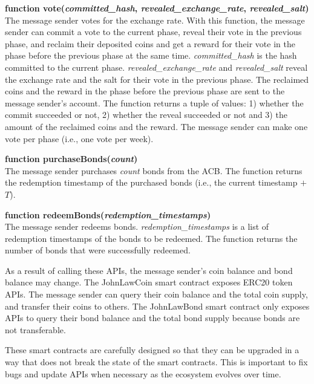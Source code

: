 \documentclass[dvipdfmx,a4paper]{article}
\begin{document}
\begin{description}
\item{\textbf{function vote(\textit{committed\_hash}, \textit{revealed\_exchange\_rate}, \textit{revealed\_salt})}}\\
The message sender votes for the exchange rate. With this function, the message sender can commit a vote to the current phase, reveal their vote in the previous phase, and reclaim their deposited coins and get a reward for their vote in the phase before the previous phase at the same time. \textit{committed\_hash} is the hash committed to the current phase. \textit{revealed\_exchange\_rate} and \textit{revealed\_salt} reveal the exchange rate and the salt for their vote in the previous phase. The reclaimed coins and the reward in the phase before the previous phase are sent to the message sender's account. The function returns a tuple of values: 1) whether the commit succeeded or not, 2) whether the reveal succeeded or not and 3) the amount of the reclaimed coins and the reward. The message sender can make one vote per phase (i.e., one vote per week).
\item{\textbf{function purchaseBonds(\textit{count})}}\\
The message sender purchases \textit{count} bonds from the ACB. The function returns the redemption timestamp of the purchased bonds (i.e., the current timestamp $+$ $T$).
\item{\textbf{function redeemBonds(\textit{redemption\_timestamps})}}\\
The message sender redeems bonds. \textit{redemption\_timestamps} is a list of redemption timestamps of the bonds to be redeemed. The function returns the number of bonds that were successfully redeemed.
\end{description}

As a result of calling these APIs, the message sender's coin balance and bond balance may change. The JohnLawCoin smart contract exposes ERC20 token APIs. The message sender can query their coin balance and the total coin supply, and transfer their coins to others. The JohnLawBond smart contract only exposes APIs to query their bond balance and the total bond supply because bonds are not transferable.

These smart contracts are carefully designed so that they can be upgraded in a way that does not break the state of the smart contracts. This is important to fix bugs and update APIs when necessary as the ecosystem evolves over time.
\end{document}
